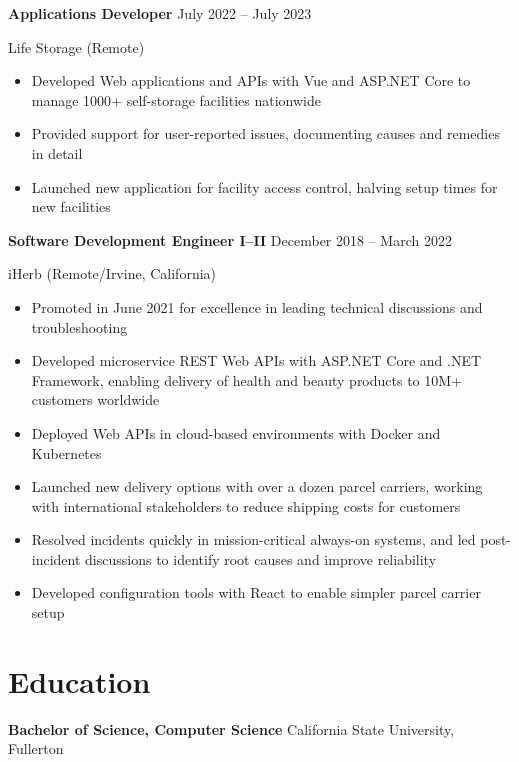 \documentclass[12pt]{article}
\newcommand{\titleheader}[2]{\textbf{#1} \symbol{"B7} #2}
\newcommand{\locheader}[2]{#1 (#2)}
\begin{document}
	\titleheader{Applications Developer}{July 2022 -- July 2023}

	\locheader{Life Storage}{Remote}

	\begin{itemize}
		\item Developed Web applications and APIs with Vue and ASP.NET Core to manage 1000+ self-storage facilities nationwide
		\item Provided support for user-reported issues, documenting causes and remedies in detail
		\item Launched new application for facility access control, halving setup times for new facilities
	\end{itemize}

	\titleheader{Software Development Engineer I--II}{December 2018 -- March 2022}

	\locheader{iHerb}{Remote/Irvine, California}

	\begin{itemize}
		\item Promoted in June 2021 for excellence in leading technical discussions and troubleshooting
		\item Developed microservice REST Web APIs with ASP.NET Core and .NET Framework, enabling delivery of health and beauty products to 10M+ customers worldwide
		\item Deployed Web APIs in cloud-based environments with Docker and Kubernetes
		\item Launched new delivery options with over a dozen parcel carriers, working with international stakeholders to reduce shipping costs for customers
		\item Resolved incidents quickly in mission-critical always-on systems, and led post-incident discussions to identify root causes and improve reliability
		\item Developed configuration tools with React to enable simpler parcel carrier setup
	\end{itemize}

	\section*{Education}

	\textbf{Bachelor of Science, Computer Science}  California State University, Fullerton
\end{document}
